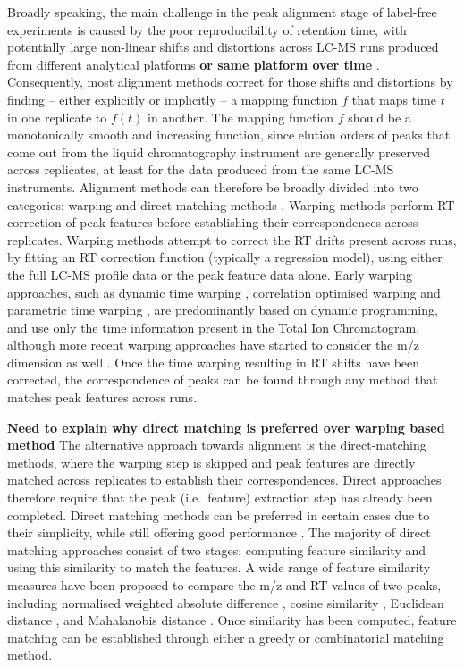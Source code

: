Broadly speaking, the main challenge in the peak alignment stage of label-free experiments is caused by the poor reproducibility of retention time, with potentially large non-linear shifts and distortions across LC-MS runs produced from different analytical platforms \textbf{or same platform over time} \cite{podwojski2009retention}. Consequently, most alignment methods correct for those shifts and distortions by finding -- either explicitly or implicitly -- a mapping function $f$ that maps time $t$ in one replicate to $f(t)$ in another. The mapping function $f$ should be a monotonically smooth and increasing function, since elution orders of peaks that come out from the liquid chromatography instrument are generally preserved across replicates, at least for the data produced from the same LC-MS instruments. Alignment methods can therefore be broadly divided into two categories: warping and direct matching methods \cite{Smith2013}. Warping methods perform RT correction of peak features before establishing their correspondences across replicates. Warping methods attempt to correct the RT drifts present across runs, by fitting an RT correction function (typically a regression model), using either the full LC-MS profile data or the peak feature data alone. Early warping approaches, such as dynamic time warping \cite{Sakoe1978}, correlation optimised warping \cite{Nielsen1998} and parametric time warping \cite{Eilers2004}, are predominantly based on dynamic programming, and use only the time information present in the Total Ion Chromatogram, although more recent warping approaches have started to consider the m/z dimension as well \cite{Christin2008}. Once the time warping resulting in RT shifts have been corrected, the correspondence of peaks can be found through any method that matches peak features across runs. 

\textbf{Need to explain why direct matching is preferred over warping based method}
The alternative approach towards alignment is the direct-matching methods, where the warping step is skipped and peak features are directly matched across replicates to establish their correspondences. Direct approaches therefore require that the peak (i.e.\ feature) extraction step has already been completed. Direct matching methods can be preferred in certain cases due to their simplicity, while still offering good performance \cite{Lange2008}. The majority of direct matching approaches consist of two stages: computing feature similarity and using this similarity to match the features. A wide range of feature similarity measures have been proposed to compare the m/z and RT values of two peaks, including normalised weighted absolute difference \cite{Pluskal2010}, cosine similarity \cite{Hoffmann2012a}, Euclidean distance \cite{Ballardini2011}, and Mahalanobis distance \cite{Voss2011a}. Once similarity has been computed, feature matching can be established through either a greedy or combinatorial matching method. 

